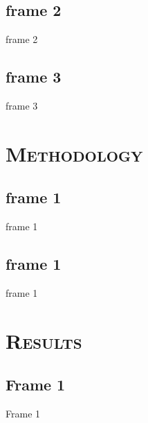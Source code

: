 \documentclass[xcolor=x11names,compress]{beamer}
\renewcommand{\(}{\begin{columns}}
\renewcommand{\)}{\end{columns}}
\newcommand{\<}[1]{\begin{column}{#1}}
\renewcommand{\>}{\end{column}}
\begin{document}
\subsection{frame 2}
\begin{frame}{frame 2}

\end{frame}

\subsection{frame 3}
\begin{frame}{frame 3}

\end{frame}


\section{\scshape Methodology}
\subsection{frame 1}
\begin{frame}{frame 1}

\end{frame}


\subsection{frame 1}
\begin{frame}{frame 1}

\end{frame}

\section{\scshape Results}
\subsection{Frame 1}
\begin{frame}{Frame 1}

\end{frame}
\end{document}
